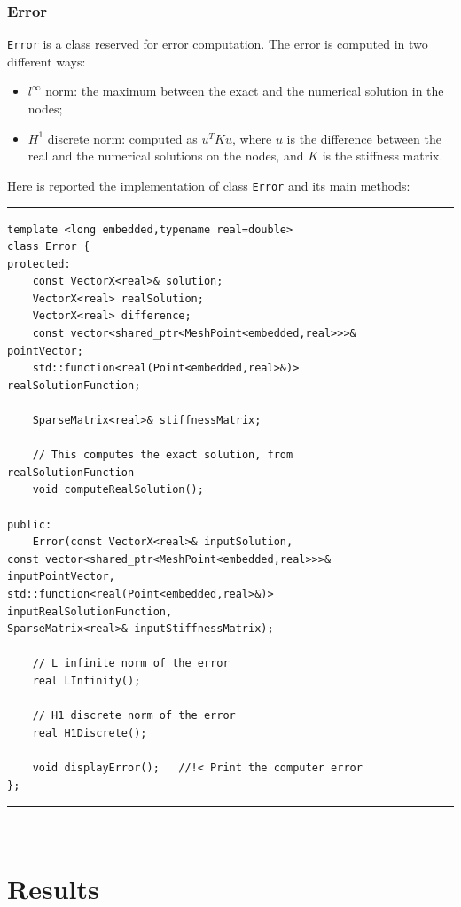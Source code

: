 \subsubsection{Error}
\verb|Error| is a class reserved for error computation. The error is computed in two different ways:
\begin{itemize}
\item $l^\infty$ norm: the maximum between the exact and the numerical solution in the nodes;
\item $H^1$ discrete norm: computed as $u^TKu$, where $u$ is the difference between the real and the numerical solutions on the nodes, and $K$ is the stiffness matrix. 
\end{itemize}

Here is reported the implementation of class \verb|Error| and its main methods:

\noindent\rule{12.7cm}{1pt}
\begin{verbatim}
template <long embedded,typename real=double>
class Error {
protected:
    const VectorX<real>& solution;
    VectorX<real> realSolution;
    VectorX<real> difference;
    const vector<shared_ptr<MeshPoint<embedded,real>>>& 
pointVector;
    std::function<real(Point<embedded,real>&)> 
realSolutionFunction;
	
    SparseMatrix<real>& stiffnessMatrix;
	
    // This computes the exact solution, from 
realSolutionFunction
    void computeRealSolution(); 
	
public:
    Error(const VectorX<real>& inputSolution,
const vector<shared_ptr<MeshPoint<embedded,real>>>& 
inputPointVector,
std::function<real(Point<embedded,real>&)> 
inputRealSolutionFunction,
SparseMatrix<real>& inputStiffnessMatrix);

    // L infinite norm of the error
    real LInfinity();
	
    // H1 discrete norm of the error
    real H1Discrete();
	
    void displayError();   //!< Print the computer error	
};
\end{verbatim}
\noindent\rule{12.7cm}{1pt}\\

\newpage
\section{Results}

